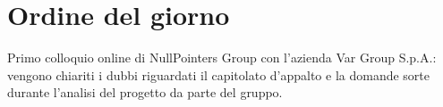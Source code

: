 \section{Ordine del giorno}

    Primo colloquio online di NullPointers Group con l'azienda Var Group S.p.A.: vengono chiariti i dubbi riguardati il capitolato d'appalto e la domande sorte durante l'analisi del progetto da parte del gruppo.